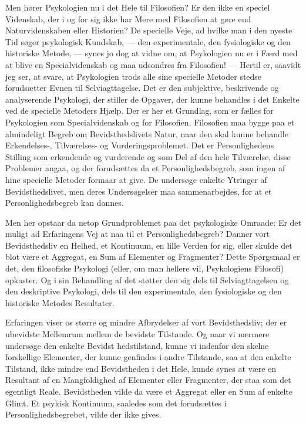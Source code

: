 \documentclass[12pt,a4paper,openany]{book}
\newcommand{\opage}[1]{\marginnote{\footnotesize\textit{[#1]}}}
\begin{document}
Men hører Psykologien nu i det Hele til Filosofien? Er den ikke en speciel
Videnskab, der i og for sig ikke har Mere med Filosofien at gøre end
Naturvidenskaben eller Historien? De specielle Veje, ad hvilke man i den nyeste
Tid søger psykologisk Kundskab, --- den experimentale, den fysiologiske og den
historiske Metode, --- synes jo dog at vidne om, at Psykologien nu er i Færd
med at blive en Specialvidenskab og maa udsondres fra Filosofien! --- Hertil
er, saavidt jeg ser, at svare, at Psykologien trods alle sine specielle Metoder
stedse forudsætter Evnen til Selviagttagelse. Det er den subjektive,
beskrivende og analyserende Psykologi, der stiller de Opgaver, der kunne
behandles i det Enkelte ved de specielle Metoders Hjælp. Der er her et
Grundlag, som er fælles for Psykologien som Specialvidenskab og for Filosofien.
Filosofien maa bygge paa et almindeligt Begreb om Bevidsthedslivets Natur, naar
den skal kunne behandle Erkendelses-, Tilværelses- og Vurderingsproblemet. Det
er Personlighedens Stilling som erkendende og vurderende og som Del af den hele
Tilværelse, disse Problemer angaa, og der forudsættes da et
Personlighedsbegreb, som ingen af hine specielle Metoder formaar at give. De
undersøge enkelte Ytringer af Bevidsthedslivet, men deres Undersøgelser maa
sammenarbejdes, for at et Personlighedsbegreb kan dannes.

Men her opstaar da netop Grundproblemet paa det psykologiske Omraade: Er det
muligt ad Erfaringens Vej at naa til et Personlighedsbegreb? Danner vort
Bevidsthedsliv en Helhed, et Kontinuum, en lille Verden for sig, eller skulde
det blot være et Aggregat, en Sum af Elementer og Fragmenter? Dette Spørgsmaal
er det, den filosofiske Psykologi (eller, om man hellere vil, Psykologiens
Filosofi) opkaster. Og i sin Behandling af det støtter den sig dels til
Selviagttagelsen og den deskriptive Psykologi, dels til den experimentale, den
fysiologiske og den historiske Metodes Resultater.

Erfaringen viser os større og mindre Afbrydelser af vort Bevidsthedsliv; der er
ubevidste Mellemrum mellem de bevidste Tilstande. Og naar vi nærmere undersøge
den enkelte Bevidst%
\opage{8}hedstilstand, kunne vi indenfor den skelne forskellige Elementer, der
kunne genfindes i andre Tilstande, saa at den enkelte Tilstand, ikke mindre end
Bevidstheden i det Hele, kunde synes at være en Resultant af en Mangfoldighed
af Elementer eller Fragmenter, der staa som det egentligt Reale. Bevidstheden
vilde da være et Aggregat eller en Sum af enkelte Glimt. Et psykisk Kontinuum,
saaledes som det forudsættes i Personlighedsbegrebet, vilde der ikke gives.
\end{document}
